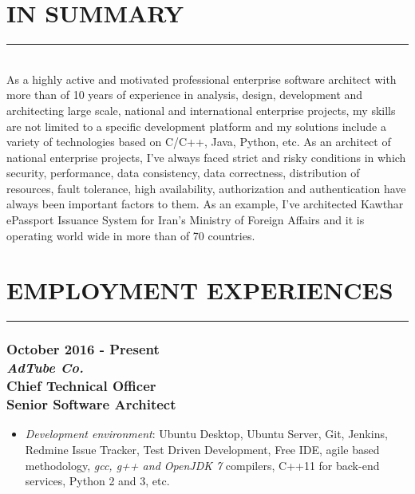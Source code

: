 \documentclass[10pt,a4paper]{article}
\begin{document}
\thispagestyle{fancy}

\section{IN SUMMARY}
\noindent \rule {3.5cm}{0.4pt} \\
As a highly active and motivated professional enterprise software architect with more than of 10 years of experience in analysis, design, development and architecting large scale, national and international enterprise projects, my skills are not limited to a specific development platform and my solutions include a variety of technologies based on C/C++, Java, Python, etc. As an architect of national enterprise projects, I've always faced strict and risky conditions in which security, performance, data consistency, data correctness, distribution of resources, fault tolerance, high availability, authorization and authentication have always been important factors to them. As an example, I've architected Kawthar ePassport Issuance System for Iran's Ministry of Foreign Affairs and it is operating world wide in more than of 70 countries.

\section{EMPLOYMENT EXPERIENCES}
\noindent \rule {7.3cm}{0.4pt}

\subsubsection{{October 2016 - Present} \\ \textnormal {\textit {AdTube Co.}} \\ {Chief Technical Officer \\ Senior Software Architect}}
  \setlength{\leftskip}{0.5cm}
  \setlength{\rightskip}{1cm}
  \begin{itemize}
    \setlength{\rightskip}{1cm}
    \setlength\itemsep{0em}
    \item \small \textit {Development environment}: Ubuntu Desktop, Ubuntu Server, Git, Jenkins, Redmine Issue Tracker, Test Driven Development, Free IDE, agile based methodology, \textit {gcc, g++ and OpenJDK 7} compilers, C++11 for back-end services, Python 2 and 3, etc.
  \end{itemize}
  \setlength{\leftskip}{0pt}
  \setlength{\rightskip}{0cm}
  
\end{document}
